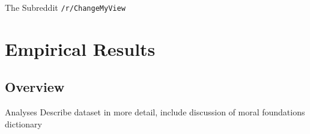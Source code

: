 \documentclass{beamer}
\begin{document}
\begin{frame}{The Subreddit \texttt{/r/ChangeMyView}}
\begin{figure}
\end{figure}
\end{frame}



\section{Empirical Results}


\subsection{Overview}

\begin{frame}{Analyses}
Describe dataset in more detail, include discussion of moral foundations dictionary
\end{frame}
\end{document}
